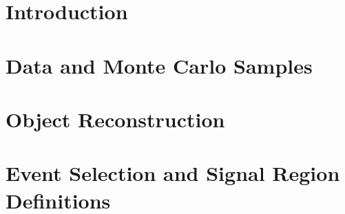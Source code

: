 \documentclass[12pt]{report}	%
\theoremstyle{definition}
\theoremstyle{remark}
\begin{document}

\section{Introduction}                                                                                                      
\label{sec:intro}                                                                                                           
                                                                                                      

\section{Data and Monte Carlo Samples}
\label{sec:data}

 
\section{Object Reconstruction}
\label{sec:obj}

 
\section{Event Selection and Signal Region Definitions}
\label{sec:evt_selection}

 
\end{document}
